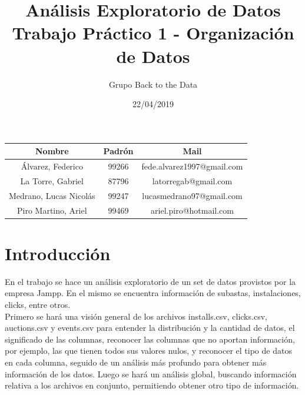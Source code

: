 \documentclass[a4paper, 12pt]{article}
\title{Análisis Exploratorio de Datos \\ Trabajo Práctico 1 - Organización de Datos}
\author{Grupo Back to the Data}
\date{22/04/2019}
\begin{document}
\begin{figure}
    \centering
\end{figure}

\maketitle

\FloatBarrier
\begin{center}
        \begin{tabular}{ |c|c|c| }
          \hline
          Nombre & Padrón & Mail \\
          \hline\hline
          Álvarez, Federico & 99266 & fede.alvarez1997@gmail.com \\
          \hline
          La Torre, Gabriel & 87796 & latorregab@gmail.com \\
          \hline
          Medrano, Lucas Nicolás & 99247 & lucasmedrano97@gmail.com \\
          \hline
          Piro Martino, Ariel & 99469 & ariel.piro@hotmail.com \\
          \hline
        \end{tabular}
\end{center}
\FloatBarrier

\newpage

\tableofcontents

\newpage
\section{Introducción}
	 En el trabajo se hace un análisis exploratorio de un set de datos provistos por la empresa Jampp. En el mismo se encuentra información de subastas, instalaciones, clicks, entre otros.\\
	 Primero se hará una visión general de los archivos installs.csv, clicks.csv, auctions.csv y events.csv para entender la distribución y la cantidad de datos, el significado de las columnas,
	 reconocer las columnas que no aportan información, por ejemplo, las que tienen todos sus valores nulos, y reconocer
	 el tipo de datos en cada columna, seguido de un análisis más profundo para obtener más información de los datos.
	 Luego se hará un análisis global, buscando información relativa a los archivos en conjunto, permitiendo obtener
	 otro tipo de información.
\end{document}
